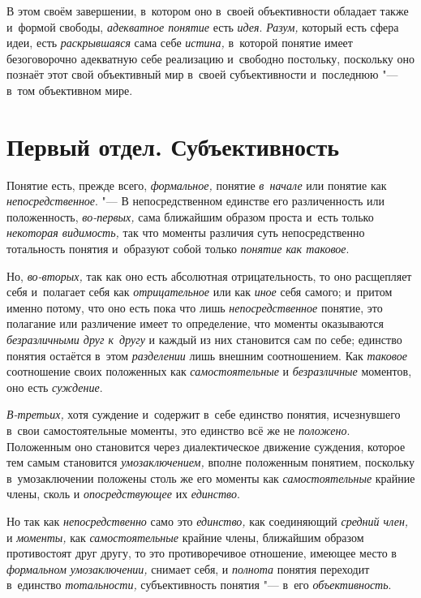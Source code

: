 В этом своём завершении, в~котором оно в~своей объективности
обладает также и~формой свободы, {\em адекватное понятие} есть
{\em идея}. {\em Разум,} который есть сфера идеи, есть {\em раскрывшаяся}
сама себе {\em истина,} в~которой понятие имеет безоговорочно адекватную себе
реализацию и~свободно постольку, поскольку оно познаёт этот свой
объективный мир в~своей субъективности и~последнюю "--- в~том объективном мире.

\part[Первый отдел\texorpdfstring{\\}{} СУБЪЕКТИВНОСТЬ]{Первый отдел. Субъективность}

Понятие есть, прежде всего, {\em формальное,} понятие {\em в~начале} или
понятие как {\em непосредственное}. "---
В непосредственном единстве его различенность или
положенность, {\em во-первых,} сама ближайшим образом проста и~есть только
{\em некоторая видимость,} так что моменты различия суть непосредственно
тотальность понятия и~образуют собой только {\em понятие как таковое}.

Но, {\em во-вторых,} так как оно есть абсолютная отрицательность, то оно
расщепляет себя и~полагает себя как {\em отрицательное} или
как {\em иное} себя самого; и~притом именно потому, что оно есть пока что лишь
{\em непосредственное} понятие, это полагание или различение имеет то
определение, что моменты оказываются {\em безразличными друг к~другу}
и каждый из них становится сам по себе; единство понятия
остаётся в~этом {\em разделении} лишь внешним соотношением. Как
{\em таковое} соотношение своих положенных как {\em самостоятельные} и
{\em безразличные} моментов, оно есть {\em суждение}.

{\em В-третьих,} хотя
суждение и~содержит в~себе единство понятия, исчезнувшего в~свои
самостоятельные моменты, это единство всё же не {\em положено}.
Положенным оно становится через диалектическое движение
суждения, которое тем самым становится {\em умозаключением,}
вполне положенным понятием, поскольку в~умозаключении
положены столь же его моменты как {\em самостоятельные}
крайние члены, сколь и {\em опосредствующее} их {\em единство}.

Но так как {\em непосредственно} само это {\em единство,} как соединяющий
{\em средний член,} и {\em моменты,} как {\em самостоятельные}
крайние члены, ближайшим образом противостоят друг другу, то
это противоречивое отношение, имеющее место в
{\em формальном умозаключении,} снимает себя, и {\em полнота} понятия
переходит в~единство {\em тотальности,}
субъективность понятия "--- в~его {\em объективность}.

